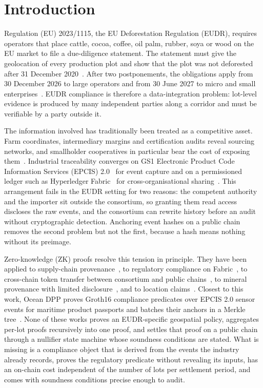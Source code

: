 \documentclass[runningheads]{llncs}
\newif\ifmarkrev
\newcommand{\rev}[1]{\ifmarkrev{\color{blue}#1}\else#1\fi}
\begin{document}
\section{Introduction}
\label{sec:intro}

Regulation (EU) 2023/1115, the EU Deforestation Regulation (EUDR), requires operators that place cattle, cocoa, coffee, oil palm, rubber, soya or wood on the EU market to file a due-diligence statement. The statement must give the geolocation of every production plot and show that the plot was not deforested after 31 December 2020~\cite{eudr2023}. After two postponements, the obligations apply from 30 December 2026 to large operators and from 30 June 2027 to micro and small enterprises~\cite{eudr2025amend}. EUDR compliance is therefore a data-integration problem: lot-level evidence is produced by many independent parties along a corridor and must be verifiable by a party outside it.

The information involved has traditionally been treated as a competitive asset. Farm coordinates, intermediary margins and certification audits reveal sourcing networks, and smallholder cooperatives in particular bear the cost of exposing them~\cite{zhunusova2022eudr}. Industrial traceability converges on GS1 Electronic Product Code Information Services (EPCIS) 2.0~\cite{gs1epcis2} for event capture and on a permissioned ledger such as Hyperledger Fabric~\cite{androulaki2018fabric} for cross-organisational sharing~\cite{saberi2019blockchain,behnke2020boundary}. This arrangement fails in the EUDR setting for two reasons: the competent authority and the importer sit outside the consortium, so granting them read access discloses the raw events, and the consortium can rewrite history before an audit without cryptographic detection. Anchoring event hashes on a public chain removes the second problem but not the first, because a hash means nothing without its preimage.

Zero-knowledge (ZK) proofs resolve this tension in principle. They have been applied to supply-chain provenance~\cite{sahai2020zkp,malik2022privchain}, to regulatory compliance on Fabric~\cite{yang2025zkfabledger}, to cross-chain token transfer between consortium and public chains~\cite{ding2026vecrotoken}, to mineral provenance with limited disclosure~\cite{hrabar2027oreproof}, and to location claims~\cite{ernstberger2025zklp}. \rev{Closest to this work, Ocean DPP proves Groth16 compliance predicates over EPCIS 2.0 sensor events for maritime product passports and batches their anchors in a Merkle tree~\cite{khairy2026oceandpp}. None of these works proves an EUDR-specific geospatial policy, aggregates per-lot proofs recursively into one proof, and settles that proof on a public chain through a nullifier state machine whose soundness conditions are stated.} What is missing is a compliance object that is derived from the events the industry already records, proves the regulatory predicate without revealing its inputs, has an on-chain cost independent of the number of lots per settlement period, and comes with soundness conditions precise enough to audit.
\end{document}

